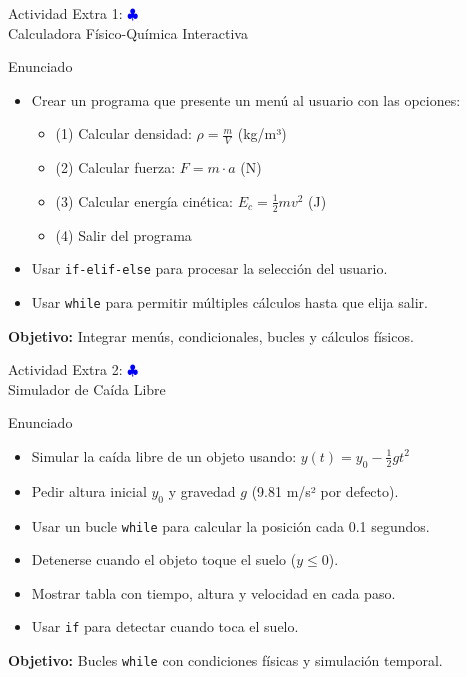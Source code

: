 \documentclass[10pt]{beamer}
\begin{document}
\begin{frame}{Actividad Extra 1: \hfill \textcolor{blue}{$\clubsuit$} \\ Calculadora Físico-Química Interactiva}
  \begin{block}{Enunciado}
    \begin{itemize}
      \item Crear un programa que presente un menú al usuario con las opciones:
        \begin{itemize}
          \item (1) Calcular densidad: \(\rho = \frac{m}{V}\) (kg/m³)
          \item (2) Calcular fuerza: \(F = m \cdot a\) (N)
          \item (3) Calcular energía cinética: \(E_c = \frac{1}{2}mv^2\) (J)
          \item (4) Salir del programa
        \end{itemize}
      \item Usar \texttt{if-elif-else} para procesar la selección del usuario.
      \item Usar \texttt{while} para permitir múltiples cálculos hasta que elija salir.
    \end{itemize}
  \end{block}
  
  \textbf{Objetivo:} Integrar menús, condicionales, bucles y cálculos físicos.
\end{frame}

\begin{frame}{Actividad Extra 2: \hfill \textcolor{blue}{$\clubsuit$} \\ Simulador de Caída Libre}
  \begin{block}{Enunciado}
    \begin{itemize}
      \item Simular la caída libre de un objeto usando: \(y(t) = y_0 - \frac{1}{2}gt^2\)
      \item Pedir altura inicial \(y_0\) y gravedad \(g\) (9.81 m/s² por defecto).
      \item Usar un bucle \texttt{while} para calcular la posición cada 0.1 segundos.
      \item Detenerse cuando el objeto toque el suelo (\(y \leq 0\)).
      \item Mostrar tabla con tiempo, altura y velocidad en cada paso.
      \item Usar \texttt{if} para detectar cuando toca el suelo.
    \end{itemize}
  \end{block}
  
  \textbf{Objetivo:} Bucles \texttt{while} con condiciones físicas y simulación temporal.
\end{frame}
\end{document}
